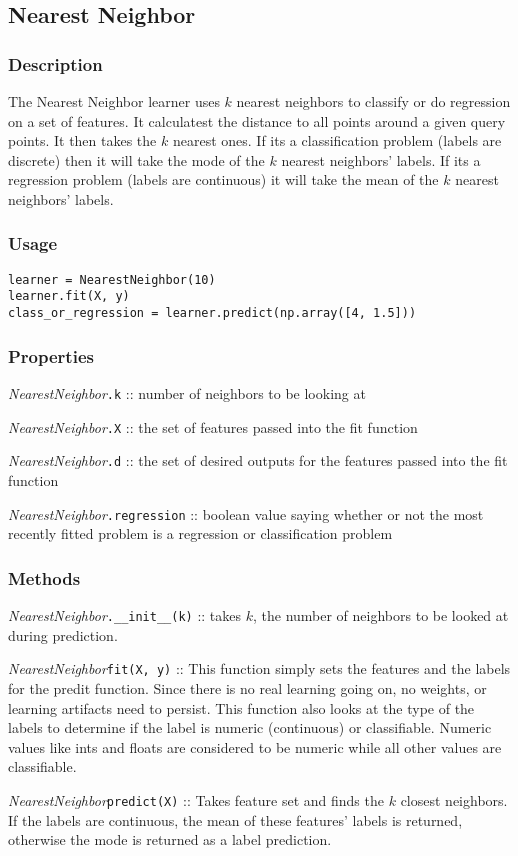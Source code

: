 \documentclass{article}
\begin{document}
\subsection{Nearest Neighbor}

\subsubsection{Description}

The Nearest Neighbor learner uses $k$ nearest neighbors to classify or do
regression on a set of features. It calculatest the distance to all points
around a given query points. It then takes the $k$ nearest ones. If its a
classification problem (labels are discrete) then it will take the mode of the
$k$ nearest neighbors' labels. If its a regression problem (labels are
continuous) it will take the mean of the $k$ nearest neighbors' labels.
\subsubsection{Usage}

\begin{verbatim}
learner = NearestNeighbor(10)
learner.fit(X, y)
class_or_regression = learner.predict(np.array([4, 1.5]))
\end{verbatim}

\subsubsection{Properties}

\textit{NearestNeighbor}\texttt{.k} :: number of neighbors to be looking at

\textit{NearestNeighbor}\texttt{.X} :: the set of features passed into the fit
function

\textit{NearestNeighbor}\texttt{.d} :: the set of desired outputs for the
features passed into the fit function

\textit{NearestNeighbor}\texttt{.regression} :: boolean value saying whether or
not the most recently fitted problem is a regression or classification problem

\subsubsection{Methods}

\textit{NearestNeighbor}\texttt{.\_\_init\_\_(k)} :: takes $k$, the number of
neighbors to be looked at during prediction.

\textit{NearestNeighbor}\texttt{fit(X, y)} :: This function simply sets the
features and the labels for the predit function. Since there is no real learning
going on, no weights, or learning artifacts need to persist. This function also
looks at the type of the labels to determine if the label is numeric
(continuous) or classifiable. Numeric values like ints and floats are considered
to be numeric while all other values are classifiable.

\textit{NearestNeighbor}\texttt{predict(X)} :: Takes feature set and finds the
$k$ closest neighbors. If the labels are continuous, the mean of these features'
labels is returned, otherwise the mode is returned as a label prediction.
\end{document}
